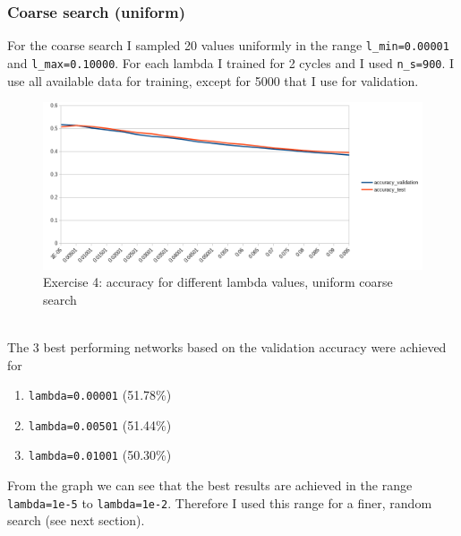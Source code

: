 \subsubsection{Coarse search (uniform)}
For the coarse search I sampled 20 values uniformly in the range \texttt{l\_min=0.00001} and \texttt{l\_max=0.10000}.
For each lambda I trained for 2 cycles and I used \texttt{n\_s=900}. I use all available data for training, except for 5000 that I use for validation.
    \begin{figure}[ht]
        \includegraphics[width=\textwidth]{../code/result_pics/coarse_search_uniform.png}
        \caption{Exercise 4: accuracy for different lambda values, uniform coarse search}
    \end{figure}
\\
The 3 best performing networks based on the validation accuracy were achieved for
\begin{enumerate}[label=(\arabic*)]
    \item \texttt{lambda=0.00001} (51.78\%)
    \item \texttt{lambda=0.00501} (51.44\%)
    \item \texttt{lambda=0.01001} (50.30\%)
\end{enumerate}
From the graph we can see that the best results are achieved in the range \texttt{lambda=1e-5} to \texttt{lambda=1e-2}. 
Therefore I used this range for a finer, random search (see next section).

\clearpage

